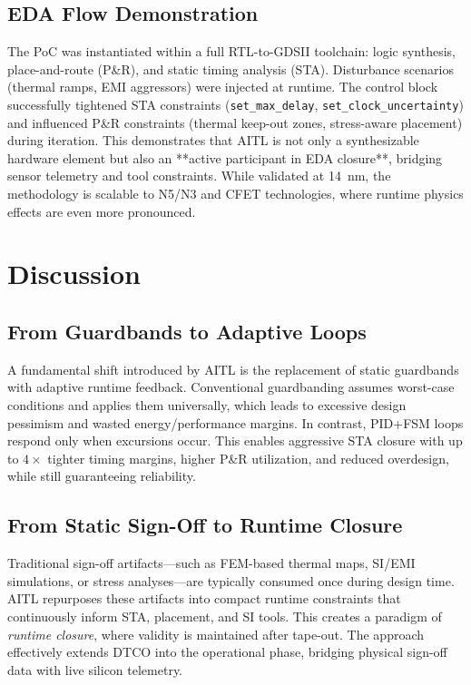 \documentclass[conference]{IEEEtran}
\begin{document}
\subsection{EDA Flow Demonstration}
The PoC was instantiated within a full RTL-to-GDSII toolchain: logic synthesis, place-and-route (P\&R), and static timing analysis (STA). Disturbance scenarios (thermal ramps, EMI aggressors) were injected at runtime. The control block successfully tightened STA constraints (\texttt{set\_max\_delay}, \texttt{set\_clock\_uncertainty}) and influenced P\&R constraints (thermal keep-out zones, stress-aware placement) during iteration.  
This demonstrates that AITL is not only a synthesizable hardware element but also an **active participant in EDA closure**, bridging sensor telemetry and tool constraints. While validated at \SI{14}{\nano\meter}, the methodology is scalable to N5/N3 and CFET technologies, where runtime physics effects are even more pronounced.

\section{Discussion}

\subsection{From Guardbands to Adaptive Loops}
A fundamental shift introduced by AITL is the replacement of static guardbands with adaptive runtime feedback. Conventional guardbanding assumes worst-case conditions and applies them universally, which leads to excessive design pessimism and wasted energy/performance margins. In contrast, PID+FSM loops respond only when excursions occur. This enables aggressive STA closure with up to $4\times$ tighter timing margins, higher P\&R utilization, and reduced overdesign, while still guaranteeing reliability.

\subsection{From Static Sign-Off to Runtime Closure}
Traditional sign-off artifacts—such as FEM-based thermal maps, SI/EMI simulations, or stress analyses—are typically consumed once during design time. AITL repurposes these artifacts into compact runtime constraints that continuously inform STA, placement, and SI tools. This creates a paradigm of \emph{runtime closure}, where validity is maintained after tape-out. The approach effectively extends DTCO into the operational phase, bridging physical sign-off data with live silicon telemetry.
\end{document}
